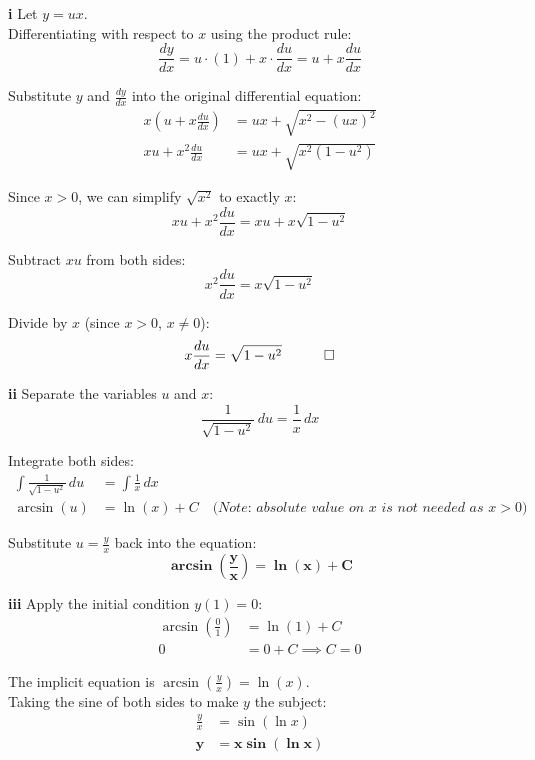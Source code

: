 \begin{solution}
\textbf{i} Let $y = ux$. \\
Differentiating with respect to $x$ using the product rule:
\[ \frac{dy}{dx} = u \cdot (1) + x \cdot \frac{du}{dx} = u + x\frac{du}{dx} \]

Substitute $y$ and $\frac{dy}{dx}$ into the original differential equation:
\begin{align*}
    x \left( u + x\frac{du}{dx} \right) &= ux + \sqrt{x^2 - (ux)^2} \\
    xu + x^2\frac{du}{dx} &= ux + \sqrt{x^2(1 - u^2)}
\end{align*}

Since $x > 0$, we can simplify $\sqrt{x^2}$ to exactly $x$:
\[ xu + x^2\frac{du}{dx} = xu + x\sqrt{1 - u^2} \]

Subtract $xu$ from both sides:
\[ x^2\frac{du}{dx} = x\sqrt{1 - u^2} \]

Divide by $x$ (since $x > 0$, $x \neq 0$):
\[ x\frac{du}{dx} = \sqrt{1 - u^2} \quad \qed \]

\vspace{0.3cm}
\textbf{ii} Separate the variables $u$ and $x$:
\[ \frac{1}{\sqrt{1 - u^2}} \, du = \frac{1}{x} \, dx \]

Integrate both sides:
\begin{align*}
    \int \frac{1}{\sqrt{1 - u^2}} \, du &= \int \frac{1}{x} \, dx \\
    \arcsin(u) &= \ln(x) + C \quad \textit{(Note: absolute value on $x$ is not needed as $x > 0$)}
\end{align*}

Substitute $u = \frac{y}{x}$ back into the equation:
\[ \mathbf{\arcsin\left(\frac{y}{x}\right) = \ln(x) + C} \]

\vspace{0.3cm}
\textbf{iii} Apply the initial condition $y(1) = 0$:
\begin{align*}
    \arcsin\left(\frac{0}{1}\right) &= \ln(1) + C \\
    0 &= 0 + C \implies C = 0
\end{align*}

The implicit equation is $\arcsin\left(\frac{y}{x}\right) = \ln(x)$. \\
Taking the sine of both sides to make $y$ the subject:
\begin{align*}
    \frac{y}{x} &= \sin(\ln x) \\
    \mathbf{y} &\mathbf{= x \sin(\ln x)}
\end{align*}


\end{solution}
